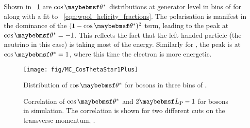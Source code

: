 Shown in \fig~\ref{fig:wpol_costheta} are $\cos\thetastar$ distributions at
generator level in bins of \PtW for \PWp along with a fit to
\eqn~\ref{eqn:wpol_helicity_fractions}. The polarisation is manifest in the
dominance of the $(1-\cos\thetastar)^2$ term, leading to the peak at
$\cos\thetastar = -1$. This reflects the fact that the left-handed particle (the
neutrino in this case) is taking most of the energy. Similarly for \PWm, the
peak is at $\cos\thetastar = 1$, where this time the electron is more energetic.

\begin{figure}[h!]
\centering
\texttt{[image: fig/MC\_CosThetaStar1Plus]}
\caption{Distribution of $\cos\thetastar$ for \PWp bosons in three bins of \PtW.}
\label{fig:wpol_costheta}
\end{figure}

\begin{figure}[h!]
\centering
{}\quad
\subfloat[[$\PtW > \unit{400}{\GeV}$]{
  \label{fig:wpol_costheta_corr400}\texttt{[image: fig/LP\_corr400]}}\quad
\caption{Correlation of $\cos\thetastar$ and $2\LP - 1$ for \PW bosons in
  simulation. The correlation is shown for two different cuts on the transverse
  momentum, \PtW.}
\label{fig:wpol_costheta_corr}
\end{figure}

